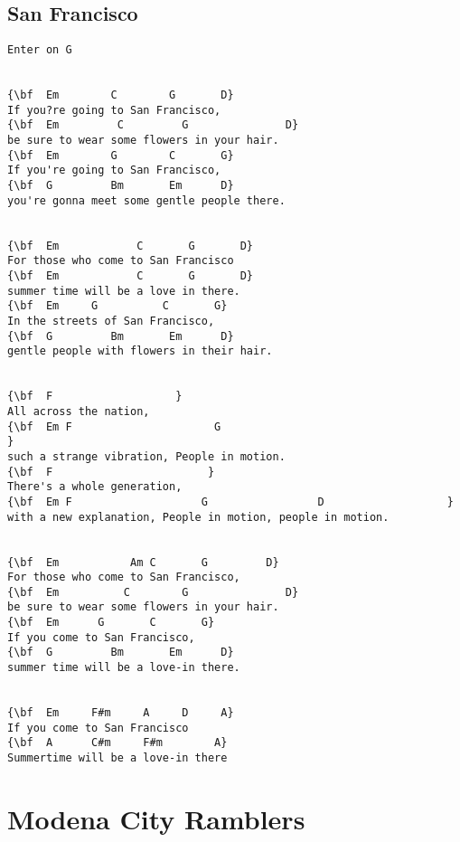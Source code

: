 \documentclass[a4paper]{article}
\begin{document}
\subsection{San Francisco}
\begin{Verbatim}[commandchars=\\\{\}]
Enter on G


{\bf  Em        C        G       D}
If you?re going to San Francisco,
{\bf  Em         C         G               D}
be sure to wear some flowers in your hair.
{\bf  Em        G        C       G}
If you're going to San Francisco,
{\bf  G         Bm       Em      D}
you're gonna meet some gentle people there.


{\bf  Em            C       G       D}
For those who come to San Francisco
{\bf  Em            C       G       D}
summer time will be a love in there.
{\bf  Em     G          C       G}
In the streets of San Francisco,
{\bf  G         Bm       Em      D}
gentle people with flowers in their hair.


{\bf  F                   }
All across the nation,
{\bf  Em F                      G                                            }
such a strange vibration, People in motion.
{\bf  F                        }
There's a whole generation,
{\bf  Em F                    G                 D                   }
with a new explanation, People in motion, people in motion.


{\bf  Em           Am C       G         D}
For those who come to San Francisco,
{\bf  Em          C        G               D}
be sure to wear some flowers in your hair.
{\bf  Em      G       C       G}
If you come to San Francisco,
{\bf  G         Bm       Em      D}
summer time will be a love-in there.


{\bf  Em     F#m     A     D     A}
If you come to San Francisco
{\bf  A      C#m     F#m        A}
Summertime will be a love-in there

\end{Verbatim}
\newpage
\section{Modena City Ramblers}
\end{document}
